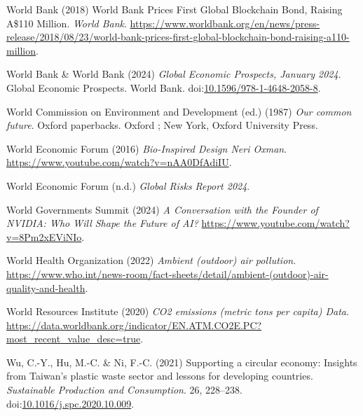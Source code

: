 \documentclass[
  letterpaper,
  DIV=11,
  numbers=noendperiod]{scrartcl}
\newlength{\cslhangindent}
\newenvironment{CSLReferences}[2] %
 {\begin{list}{}{%
  \setlength{\itemindent}{0pt}
  \setlength{\leftmargin}{0pt}
  \setlength{\parsep}{0pt}
  \ifodd #1
   \setlength{\leftmargin}{\cslhangindent}
   \setlength{\itemindent}{-1\cslhangindent}
  \fi
  \setlength{\itemsep}{#2\baselineskip}}}
 {\end{list}}
\begin{document}
\begin{CSLReferences}{0}{1}
World Bank (2018) World {Bank Prices First Global Blockchain Bond},
{Raising A}\$110 {Million}. \emph{World Bank}.
\url{https://www.worldbank.org/en/news/press-release/2018/08/23/world-bank-prices-first-global-blockchain-bond-raising-a110-million}.

World Bank \& World Bank (2024) \emph{Global {Economic Prospects},
{January} 2024}. Global {Economic Prospects}. World Bank.
doi:\href{https://doi.org/10.1596/978-1-4648-2058-8}{10.1596/978-1-4648-2058-8}.

World Commission on Environment and Development (ed.) (1987) \emph{Our
common future}. Oxford paperbacks. Oxford ; New York, Oxford University
Press.

World Economic Forum (2016) \emph{Bio-{Inspired Design} {\textbar} {Neri
Oxman}}. \url{https://www.youtube.com/watch?v=nAA0DfAdiIU}.

World Economic Forum (n.d.) \emph{Global {Risks Report} 2024}.

World Governments Summit (2024) \emph{A {Conversation} with the
{Founder} of {NVIDIA}: {Who Will Shape} the {Future} of {AI}?}
\url{https://www.youtube.com/watch?v=8Pm2xEViNIo}.

World Health Organization (2022) \emph{Ambient (outdoor) air pollution}.
\url{https://www.who.int/news-room/fact-sheets/detail/ambient-(outdoor)-air-quality-and-health}.

World Resources Institute (2020) \emph{{CO2} emissions (metric tons per
capita) {\textbar} {Data}}.
\url{https://data.worldbank.org/indicator/EN.ATM.CO2E.PC?most_recent_value_desc=true}.

Wu, C.-Y., Hu, M.-C. \& Ni, F.-C. (2021) Supporting a circular economy:
{Insights} from {Taiwan}'s plastic waste sector and lessons for
developing countries. \emph{Sustainable Production and Consumption}. 26,
228--238.
doi:\href{https://doi.org/10.1016/j.spc.2020.10.009}{10.1016/j.spc.2020.10.009}.


\end{CSLReferences}
\end{document}
